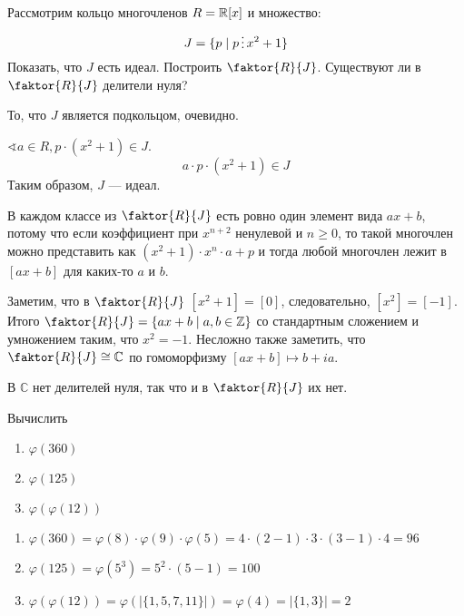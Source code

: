 \begin{exercise}
    Рассмотрим кольцо многочленов \(R = \mathbb{R}[x]\) и множество:
    \[J = \{p \mid p \divided x^2 + 1\}\]
    Показать, что \(J\) есть идеал. Построить \(\faktor{R}{J}\). Существуют ли в \(\faktor{R}{J}\) делители нуля?
\end{exercise}
\begin{solution}
    То, что \(J\) является подкольцом, очевидно.

    \(\sphericalangle a \in R, p \cdot (x^2 + 1) \in J\).
    \[a \cdot p \cdot (x^2 + 1) \in J\]
    Таким образом, \(J\) --- идеал.

    В каждом классе из \(\faktor{R}{J}\) есть ровно один элемент вида \(ax + b\), потому что если коэффициент при \(x^{n + 2}\) ненулевой и \(n \geq 0\), то такой многочлен можно представить как \((x^2 + 1) \cdot x^n \cdot a + p\) и тогда любой многочлен лежит в \([ax + b]\) для каких-то \(a\) и \(b\).

    Заметим, что в \(\faktor{R}{J}\) \([x^2 + 1] = [0]\), следовательно, \([x^2] = [- 1]\). Итого \(\faktor{R}{J} = \{ax + b \mid a, b \in \Z\}\) со стандартным сложением и умножением таким, что \(x^2 = - 1\). Несложно также заметить, что \(\faktor{R}{J} \cong \mathbb{C}\) по гомоморфизму \([ax + b] \mapsto b + ia\).

    В \(\mathbb{C}\) нет делителей нуля, так что и в \(\faktor{R}{J}\) их нет.
\end{solution}

\begin{exercise}
    Вычислить
    \begin{enumerate}
        \item \(\varphi(360)\)
        \item \(\varphi(125)\)
        \item \(\varphi(\varphi(12))\)
    \end{enumerate}
\end{exercise}
\begin{solution}\itemfix
    \begin{enumerate}
        \item \(\varphi(360) = \varphi(8) \cdot \varphi(9) \cdot \varphi(5) = 4 \cdot (2 - 1) \cdot 3 \cdot (3 - 1) \cdot 4 = 96\)
        \item \(\varphi(125) = \varphi(5^3) = 5^2 \cdot (5 - 1) = 100\)
        \item \(\varphi(\varphi(12)) = \varphi(|\{1,5,7,11\}|) = \varphi(4) = |\{1,3\}| = 2\)
    \end{enumerate}
\end{solution}

